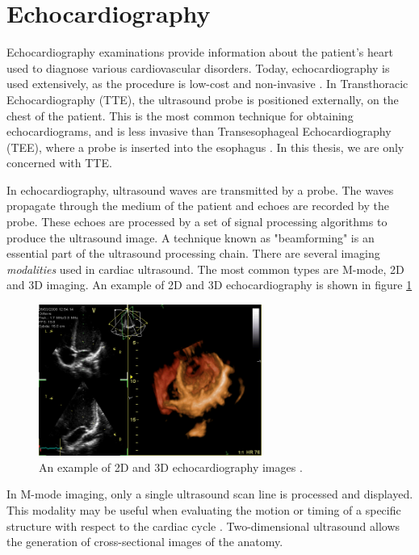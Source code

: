 \documentclass{article}
\begin{document}
\section{Echocardiography}
Echocardiography examinations provide information about the patient's heart used to diagnose various 
cardiovascular disorders. Today, echocardiography is used extensively, as the procedure is low-cost and non-invasive \cite{Omerovic2023}.
In Transthoracic Echocardiography (TTE), the ultrasound probe is positioned externally, on the chest of the patient.
This is the most common technique for obtaining echocardiograms, and is less invasive than Transesophageal Echocardiography (TEE), where 
a probe is inserted into the esophagus \cite{Omerovic2023}. In this thesis, we are only concerned with TTE.

In echocardiography, ultrasound waves are transmitted by a probe. The waves propagate through the medium of the patient and echoes are recorded
by the probe. These echoes are processed by a set of signal processing algorithms to produce the ultrasound image. A technique known as "beamforming" is an essential part of the ultrasound processing chain. 
There are several imaging \textit{modalities} used in cardiac ultrasound. The most common types are M-mode, 2D and 3D imaging.
An example of 2D and 3D echocardiography is shown in figure \ref{fig:echoExample}

\begin{figure}[tbh!]
    \centering
    \includegraphics[width=0.65\textwidth]{images/Apikal4D.png}
    \caption{An example of 2D and 3D echocardiography images \cite{lenes2008apikal4d}.}
    \label{fig:echoExample}
\end{figure}

In M-mode imaging, only a single ultrasound scan line is processed and displayed. This modality
may be useful when evaluating the motion or timing of a specific structure with respect to the cardiac cycle \cite{SAUL2015686}.
Two-dimensional ultrasound allows the generation of cross-sectional images of the anatomy.
\end{document}
